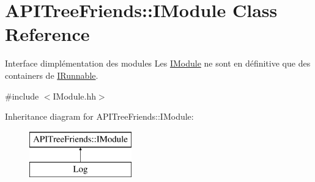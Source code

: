 \hypertarget{class_a_p_i_tree_friends_1_1_i_module}{}\section{A\+P\+I\+Tree\+Friends\+:\+:I\+Module Class Reference}
\label{class_a_p_i_tree_friends_1_1_i_module}


Interface d\textquotesingle{}implémentation des modules Les \hyperlink{class_a_p_i_tree_friends_1_1_i_module}{I\+Module} ne sont en définitive que des containers de \hyperlink{class_a_p_i_tree_friends_1_1_i_runnable}{I\+Runnable}.  




{\ttfamily \#include $<$I\+Module.\+hh$>$}

Inheritance diagram for A\+P\+I\+Tree\+Friends\+:\+:I\+Module\+:\begin{figure}[H]
\begin{center}
\leavevmode
\includegraphics[height=2.000000cm]{class_a_p_i_tree_friends_1_1_i_module}
\end{center}
\end{figure}

